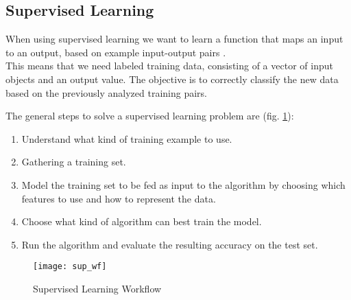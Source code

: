 \subsection{Supervised Learning} \label{supervised}
When using supervised learning we want to learn a function that maps an input to an output, based on example input-output pairs \cite{ai_sup}. \\
This means that we need labeled training data, consisting of a vector of input objects and an output value. The objective is to correctly classify the new data based on the previously analyzed training pairs.

The general steps to solve a supervised learning problem are (fig. \ref{fig:sup_wf}):
\begin{enumerate}[noitemsep]
	\item Understand what kind of training example to use.
	\item Gathering a training set.
	\item Model the training set to be fed as input to the algorithm by choosing which features to use and how to represent the data.
	\item Choose what kind of algorithm can best train the model.
	\item Run the algorithm and evaluate the resulting accuracy on the test set.
\end{enumerate}

\begin{figure}[H]
	\centering
	\texttt{[image: sup\_wf]}
	\caption{Supervised Learning Workflow \cite{sup_wf}}
	\label{fig:sup_wf}
\end{figure}


